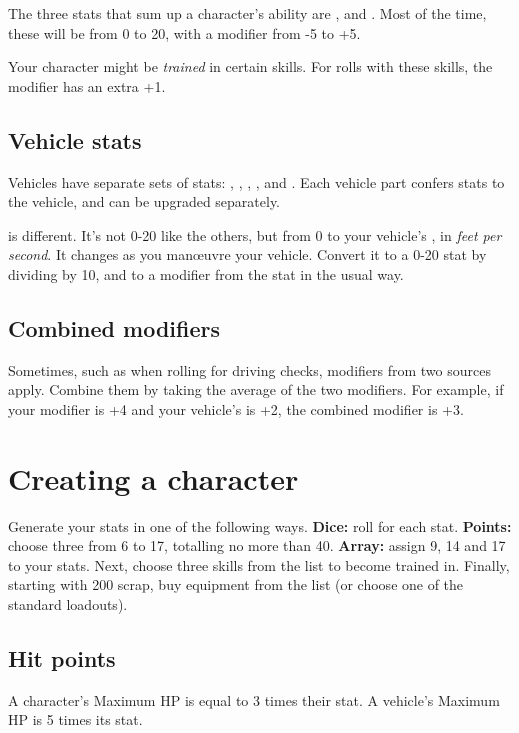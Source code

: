 \documentclass[10pt, a4paper, twocolumn]{article}
\begin{document}
The three stats that sum up a character's ability are ,  and . Most of the time, these will be from 0 to 20, with a modifier from -5 to +5.

Your character might be \emph{trained} in certain skills. For rolls with these skills, the modifier has an extra +1.

\subsection{Vehicle stats}
Vehicles have separate sets of stats: , , , ,  and . Each vehicle part confers stats to the vehicle, and can be upgraded separately.

 is different. It's not 0-20 like the others, but from 0 to your vehicle's , in \emph{feet per second}. It changes as you man\oe{}uvre your vehicle. Convert it to a 0-20 stat by dividing by 10, and to a modifier from the stat in the usual way.

\subsection{Combined modifiers}
Sometimes, such as when rolling for driving checks, modifiers from two sources apply. Combine them by taking the average of the two modifiers. For example, if your  modifier is +4 and your vehicle's  is +2, the combined modifier is +3.

\section{Creating a character}
Generate your stats in one of the following ways. \textbf{Dice:} roll  for each stat. \textbf{Points:} choose three from 6 to 17, totalling no more than 40. \textbf{Array:} assign 9, 14 and 17 to your stats. Next, choose three skills from the list to become trained in. Finally, starting with 200 scrap, buy equipment from the list (or choose one of the standard loadouts).

\subsection{Hit points}
A character's Maximum HP is equal to 3 times their  stat. A vehicle's Maximum HP is 5 times its  stat.
\end{document}
